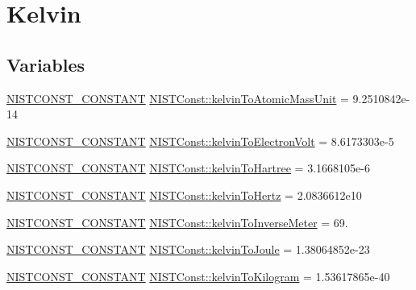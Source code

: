 \hypertarget{group___n_i_s_t_const-_kelvin}{}\section{Kelvin}
\label{group___n_i_s_t_const-_kelvin}
\subsection*{Variables}
\begin{DoxyCompactItemize}
\item 
\mbox{\hyperlink{_n_i_s_t_const_8hpp_a2b0fc1d7452373f816175dd86ce26729}{N\+I\+S\+T\+C\+O\+N\+S\+T\+\_\+\+C\+O\+N\+S\+T\+A\+NT}} \mbox{\hyperlink{group___n_i_s_t_const-_kelvin_ga06d7f847cbeeb75fd01a52b95b60de50}{N\+I\+S\+T\+Const\+::kelvin\+To\+Atomic\+Mass\+Unit}} = 9.\+2510842e-\/14
\item 
\mbox{\hyperlink{_n_i_s_t_const_8hpp_a2b0fc1d7452373f816175dd86ce26729}{N\+I\+S\+T\+C\+O\+N\+S\+T\+\_\+\+C\+O\+N\+S\+T\+A\+NT}} \mbox{\hyperlink{group___n_i_s_t_const-_kelvin_ga85355343e763185fe602b8eeacebc12d}{N\+I\+S\+T\+Const\+::kelvin\+To\+Electron\+Volt}} = 8.\+6173303e-\/5
\item 
\mbox{\hyperlink{_n_i_s_t_const_8hpp_a2b0fc1d7452373f816175dd86ce26729}{N\+I\+S\+T\+C\+O\+N\+S\+T\+\_\+\+C\+O\+N\+S\+T\+A\+NT}} \mbox{\hyperlink{group___n_i_s_t_const-_kelvin_gaddf6d309db30c552489d13894901746a}{N\+I\+S\+T\+Const\+::kelvin\+To\+Hartree}} = 3.\+1668105e-\/6
\item 
\mbox{\hyperlink{_n_i_s_t_const_8hpp_a2b0fc1d7452373f816175dd86ce26729}{N\+I\+S\+T\+C\+O\+N\+S\+T\+\_\+\+C\+O\+N\+S\+T\+A\+NT}} \mbox{\hyperlink{group___n_i_s_t_const-_kelvin_ga3fc1294bab1527265c87fd2df49d568c}{N\+I\+S\+T\+Const\+::kelvin\+To\+Hertz}} = 2.\+0836612e10
\item 
\mbox{\hyperlink{_n_i_s_t_const_8hpp_a2b0fc1d7452373f816175dd86ce26729}{N\+I\+S\+T\+C\+O\+N\+S\+T\+\_\+\+C\+O\+N\+S\+T\+A\+NT}} \mbox{\hyperlink{group___n_i_s_t_const-_kelvin_ga7c76d99ebcba19f9c15c6dc96282576b}{N\+I\+S\+T\+Const\+::kelvin\+To\+Inverse\+Meter}} = 69.
\item 
\mbox{\hyperlink{_n_i_s_t_const_8hpp_a2b0fc1d7452373f816175dd86ce26729}{N\+I\+S\+T\+C\+O\+N\+S\+T\+\_\+\+C\+O\+N\+S\+T\+A\+NT}} \mbox{\hyperlink{group___n_i_s_t_const-_kelvin_ga2257299cf7bd7dd841a7325e47a67907}{N\+I\+S\+T\+Const\+::kelvin\+To\+Joule}} = 1.\+38064852e-\/23
\item 
\mbox{\hyperlink{_n_i_s_t_const_8hpp_a2b0fc1d7452373f816175dd86ce26729}{N\+I\+S\+T\+C\+O\+N\+S\+T\+\_\+\+C\+O\+N\+S\+T\+A\+NT}} \mbox{\hyperlink{group___n_i_s_t_const-_kelvin_gad28887701d9265b5489c4deaabee8deb}{N\+I\+S\+T\+Const\+::kelvin\+To\+Kilogram}} = 1.\+53617865e-\/40
\end{DoxyCompactItemize}


